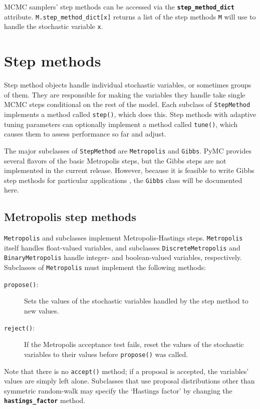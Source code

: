 MCMC samplers' step methods can be accessed via the \texttt{\textbf{step_method_dict}} attribute. \texttt{M.step_method_dict[x]} returns a list of the step methods \texttt{M} will use to handle the stochastic variable \texttt{x}.


\hypertarget{step-method}{}
\section*{Step methods} \label{sec:stepmethod}


Step method objects handle individual stochastic variables, or sometimes groups of them. They are responsible for making the variables they handle take single MCMC steps conditional on the rest of the model. Each subclass of \texttt{StepMethod} implements a method called \texttt{step()}, which does this. Step methods with adaptive tuning parameters can optionally implement a method called \texttt{tune()}, which causes them to assess performance so far and adjust.

The major subclasses of \texttt{StepMethod} are \texttt{Metropolis} and \texttt{Gibbs}. PyMC provides several flavors of the basic Metropolis steps, but the Gibbs steps are not implemented in the current release. However, because it is feasible to write Gibbs step methods for particular applications , the \texttt{Gibbs} class will be documented here.

\hypertarget{metropolis}{}
\subsection*{Metropolis step methods} \label{metropolis}

\texttt{Metropolis} and subclasses implement Metropolis-Hastings steps. \texttt{Metropolis} itself handles float-valued variables, and subclasses \texttt{DiscreteMetropolis} and \texttt{BinaryMetropolis} handle integer- and boolean-valued variables, respectively. Subclasses of \texttt{Metropolis} must implement the following methods:
\begin{description}
    \item[\texttt{propose()}:] Sets the values of the stochastic variables handled by the step method to new values.
    \item[\texttt{reject()}:] If the Metropolis acceptance test fails, reset the values of the stochastic variables to their values before \texttt{propose()} was called.
\end{description}
Note that there is no \texttt{accept()} method; if a proposal is accepted, the variables' values are simply left alone. Subclasses that use proposal distributions other than symmetric random-walk may specify the `Hastings factor' by changing the \textbf{\texttt{hastings_factor}} method.

